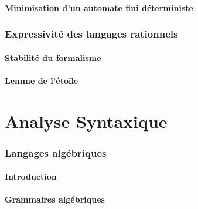 \subsection{Minimisation d'un automate fini déterministe}








 
\section{Expressivité des langages rationnels}
 
\subsection{Stabilité du formalisme}



 
\subsection{Lemme de l'étoile}




 
 
\part{Analyse Syntaxique}


\section{Langages algébriques}
 
\subsection{Introduction}


 
\subsection{Grammaires algébriques}







